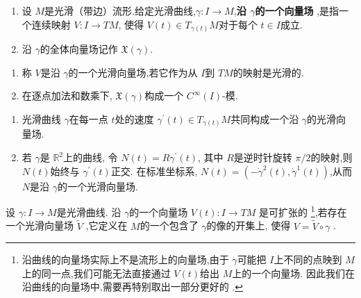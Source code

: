 \documentclass[../../几何与拓扑.tex]{subfiles}
\begin{document}
\begin{definition}
    \begin{enumerate}
        \item 设 \(  M  \)是光滑（带边）流形.给定光滑曲线,\(   \gamma :I\to M  \),\textbf{沿 \(   \gamma   \)的一个向量场 },是指一个连续映射 \(  V: I\to TM  \),
        使得 \(  V\left( t \right) \in T_{ \gamma \left( t \right) }M    \)对于每个 \(  t \in I  \)成立.
        \item     沿 \(   \gamma   \)的全体向量场记作 \(  \mathfrak{X}\left(  \gamma  \right)   \).  
    \end{enumerate}
\end{definition}

\begin{remark}
    \begin{enumerate}
        \item 称 \(  V  \)是沿 \(   \gamma   \)的一个光滑向量场,若它作为从 \(  I  \)到 \(  TM  \)的映射是光滑的.  
        \item 在逐点加法和数乘下, \(  \mathfrak{X}\left(  \gamma  \right)   \)构成一个 \(  C^{\infty}\left( I \right)   \)-模.    
    \end{enumerate}
    
\end{remark}

\begin{example}
    \begin{enumerate}
        \item 光滑曲线 \(   \gamma   \)在每一点 \(  t  \)处的速度 \(   \gamma ^{\prime} \left( t \right) \in T_{ \gamma \left( t \right) }M   \)共同构成一个沿 \(   \gamma   \)的光滑向量场.
        \item 若 \(   \gamma   \)是 \(  \mathbb{R} ^{2}  \)上的曲线, 令 \(  N\left( t \right) =  R \gamma ^{\prime} \left( t \right)    \),   其中 \(  R  \)是逆时针旋转 \(  \pi /2  \)的映射,则 \(  N\left( t \right)   \)始终与 \(   \gamma ^{\prime} \left( t \right)   \)正交.
        在标准坐标系, \(  N\left( t \right) =  \left( - \dot{\gamma}^{2}\left( t \right), \dot{\gamma}^{1}\left( t \right)   \right)    \),从而 \(  N  \)是沿 \(   \gamma   \)的一个光滑向量场.       
    \end{enumerate}
        
\end{example}

\hspace*{\fill} 

\begin{proposition}
    设 \(   \gamma : I\to M  \)是光滑曲线. 沿 \(   \gamma   \)的一个向量场 \(  V\left( t \right)   :I\to TM\)  是可扩张的 \footnote{沿曲线的向量场实际上不是流形上的向量场,由于 \(   \gamma   \)可能把 \(  I  \)上不同的点映到 \(  M  \)上的同一点,我们可能无法直接通过 \(  V  \left( t \right) \)给出 \(  M  \)上的一个向量场. 因此我们在沿曲线的向量场中,需要再特别取出一部分更好的 . },若存在一个光滑向量场 \(  \tilde{V}  \) ,它定义在 \(  M  \)的一个包含了 \(   \gamma   \)的像的开集上,  使得  \(  V =  \tilde{V}\circ  \gamma   \) .
\end{proposition}
\end{document}
